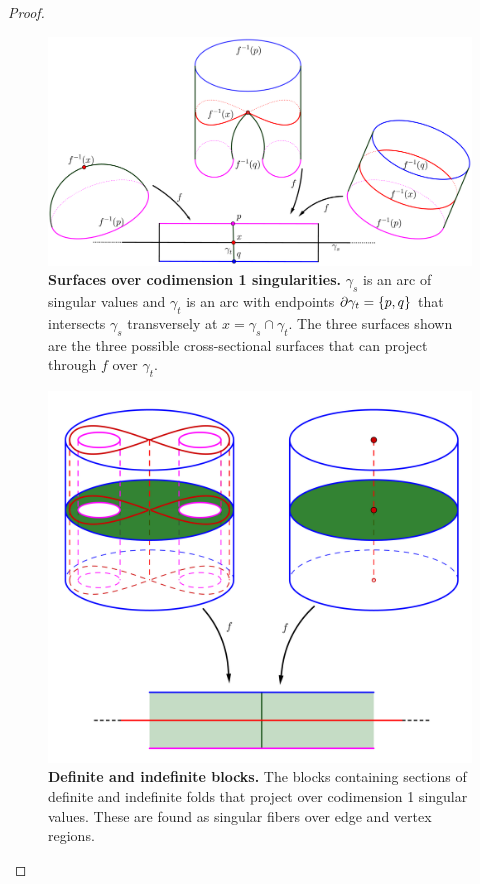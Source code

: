 \begin{proof}
%	
	\begin{figure}[h!]
		\centering
		\includegraphics[width=\textwidth]{figures/codim-1-surfaces.png}
		\caption{
			\textbf{Surfaces over codimension 1 singularities.}
			$\gamma_s$ is an arc of singular values and $\gamma_t$ is an arc with endpoints $\partial\gamma_t = \{p,q\}$ that intersects $\gamma_s$ transversely at $x=\gamma_s\cap\gamma_t$.
			The three surfaces shown are the three possible cross-sectional surfaces that can project through $f$ over $\gamma_t$.
		}
		\label{fig:codim-1-surfaces}
	\end{figure}
	
	\begin{figure}[h!]
		\centering
		\includegraphics[width=\textwidth]{figures/codim-1-blocks.png}
		\caption{
			\textbf{Definite and indefinite blocks.}
			The blocks containing sections of definite and indefinite folds that project over codimension 1 singular values.
			These are found as singular fibers over edge and vertex regions.
		}
		\label{fig:codim-1-blocks}
	\end{figure}




\end{proof}
